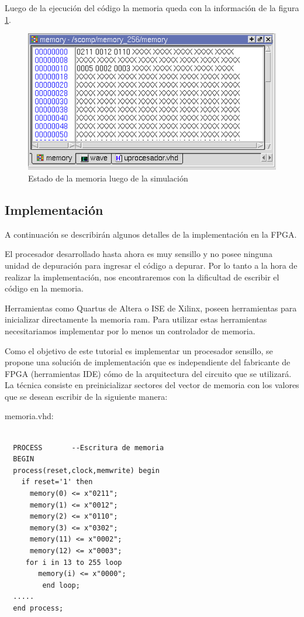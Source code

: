 Luego de la ejecución del código la memoria queda con la información de la figura \ref{mempostsimulation}.

\begin{figure}[h!]
  \centering
    \includegraphics[width=.6\textwidth]{graficos/uprocpostsimulation.png}
  \caption{Estado de la memoria luego de la simulación}
  \label{mempostsimulation}
\end{figure}

\newpage

\subsection{Implementación}
A continuación se describirán algunos detalles de la implementación en la FPGA.

El procesador desarrollado hasta ahora es muy sensillo y no posee ninguna unidad de depuración para ingresar el código a depurar. Por lo
tanto a la hora de realizar la implementación, nos encontraremos con la dificultad de escribir el código en la memoria.

Herramientas como Quartus de Altera o ISE de Xilinx, poseen herramientas para inicializar directamente la memoria ram. Para utilizar estas herramientas 
necesitariamos implementar por lo menos un controlador de memoria.

Como el objetivo de este tutorial es implementar un procesador sensillo, se propone una solución de implementación que es independiente
del fabricante de FPGA (herramientas IDE) cómo de la arquitectura del circuito que se utilizará.
La técnica consiste en preinicializar sectores del vector de memoria con los valores que se desean escribir de la siguiente manera:

memoria.vhd:
\begin{lstlisting}[style=vhdl, basicstyle=\footnotesize\ttfamily]

  PROCESS       --Escritura de memoria
  BEGIN
  process(reset,clock,memwrite) begin
    if reset='1' then
	  memory(0) <= x"0211";
	  memory(1) <= x"0012";
	  memory(2) <= x"0110";
	  memory(3) <= x"0302";
	  memory(11) <= x"0002";
	  memory(12) <= x"0003";
     for i in 13 to 255 loop 
	    memory(i) <= x"0000";
		 end loop;
  .....
  end process;
\end{lstlisting}
